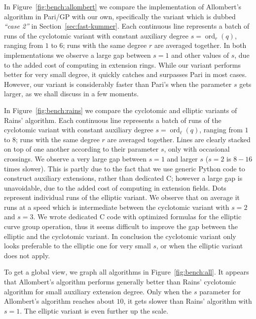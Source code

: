 \documentclass[12pt]{article}
\theoremstyle{plain}
\theoremstyle{definition}
\DeclareMathOperator{\order}{ord} %
\newcounter{algorithm}
\begin{document}
In Figure~\ref{fig:bench:allombert} we compare the implementation of
Allombert's algorithm in Pari/GP with our own, specifically the
variant which is dubbed \emph{``case 2''} in
Section~\ref{sec:fast-kummer}. Each continuous line represents a batch
of runs of the cyclotomic variant with constant auxiliary degree
$s=\order_r(q)$, ranging from $1$ to $6$; runs with the same degree
$r$ are averaged together. In both implementations we observe a large
gap between $s=1$ and other values of $s$, due to the added cost of
computing in extension rings. While our variant performs better for
very small degree, it quickly catches and surpasses Pari in most
cases. However, our variant is considerably faster than Pari's when
the parameter $s$ gets larger, as we shall discuss in a few moments.

In Figure~\ref{fig:bench:rains} we compare the cyclotomic and elliptic
variants of Rains' algorithm. Each continuous line represents a batch
of runs of the cyclotomic variant with constant auxiliary degree
$s=\order_\ell(q)$, ranging from $1$ to $8$; runs with the same degree
$r$ are averaged together. Lines are clearly stacked on top of one
another according to their parameter $s$, only with occasional
crossings. We observe a very large gap between $s=1$ and larger $s$
($s=2$ is $8-16$ times slower). This is partly due to the fact that we
use generic Python code to construct auxiliary extensions, rather than
dedicated C; however a large gap is unavoidable, due to the added cost
of computing in extension fields. Dots represent individual runs of
the elliptic variant. We observe that on average it runs at a speed
which is intermediate between the cyclotomic variant with $s=2$ and
$s=3$. We wrote dedicated C code with optimized formulas for the
elliptic curve group operation, thus it seems difficult to improve the
gap between the elliptic and the cyclotomic variant. In conclusion the
cyclotomic variant only looks preferable to the elliptic one for very
small $s$, or when the elliptic variant does not apply.

To get a global view, we graph all algorithms in
Figure~\ref{fig:bench:all}. It appears that Allombert's algorithm
performs generally better than Rains' cyclotomic algorithm for small
auxiliary extension degree. Only when the $s$ parameter for
Allombert's algorithm reaches about $10$, it gets slower than Rains'
algorithm with $s=1$. The elliptic variant is even further up the
scale.
\end{document}
